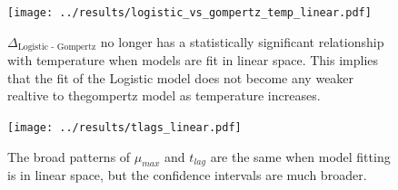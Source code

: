 \documentclass[11pt, a4paper]{article}
\begin{document}
                                \begin{figure}[H]
        \texttt{[image: ../results/logistic\_vs\_gompertz\_temp\_linear.pdf]}
        \centering
        \caption{$\Delta_{\text{Logistic - Gompertz}}$ no longer has a statistically significant relationship with temperature when models are fit in linear space. This implies that the fit of the Logistic model does not become any weaker realtive to thegompertz model as temperature increases.}
        \label{sup:logistic_temp_linear}
        \end{figure} 
        
                                        \begin{figure}[H]
        \texttt{[image: ../results/tlags\_linear.pdf]}
        \centering
        \caption{The broad patterns of $\mu_{max}$ and $t_{lag}$ are the same when model fitting is in linear space, but the confidence intervals are much broader.}
        \label{sup:params_linear}
        \end{figure} 
        
        
    
    
\end{document}
